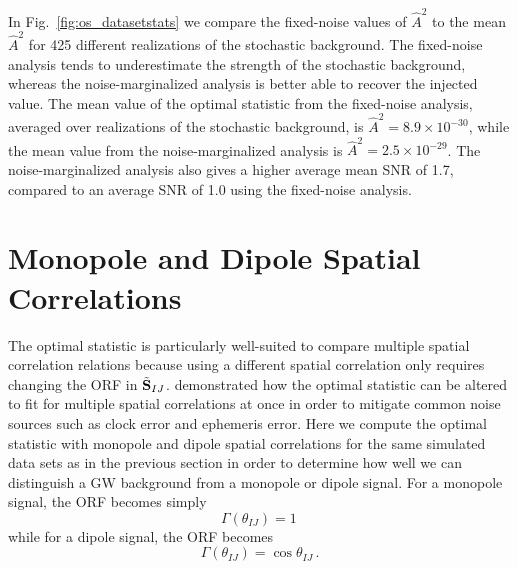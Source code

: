 \documentclass[twocolumn,aps,prd,superscriptaddress]{revtex4-1}
\newcommand{\Agw}{\ensuremath{A_\mathrm{gw}}}
\begin{document}
In Fig.~\ref{fig:os_datasetstats} we compare the fixed-noise values of $\hat{A}^2$ 
to the mean $\hat{A}^2$ for 425 different realizations of the stochastic background. 
The fixed-noise analysis tends to underestimate the strength of the stochastic background, 
whereas the noise-marginalized analysis is better able to recover the injected value. 
The mean value of the optimal statistic from the fixed-noise analysis, 
averaged over realizations of the stochastic background, is $\hat{A}^2 = 8.9 \times 10^{-30}$, 
while the mean value from the noise-marginalized analysis is $\hat{A}^2 = 2.5 \times 10^{-29}$. 
The noise-marginalized analysis also gives a higher average mean SNR of 1.7, 
compared to an average SNR of 1.0 using the fixed-noise analysis.


\section{Monopole and Dipole Spatial Correlations}
\label{sec:spatial}

The optimal statistic is particularly well-suited to compare multiple spatial correlation relations 
because using a different spatial correlation only requires changing the ORF 
in $\tilde{{\bf{S}}}_{IJ}$. 
\citet{thk+2016} demonstrated how the optimal statistic can be altered to fit for 
multiple spatial correlations at once in order to mitigate common noise sources such as 
clock error and ephemeris error. 
Here we compute the optimal statistic with monopole and dipole spatial correlations 
for the same simulated data sets as in the previous section in order to determine 
how well we can distinguish a GW background from a monopole or dipole signal. 
For a monopole signal, the ORF becomes simply
\[ \Gamma(\theta_{IJ}) = 1 \,\]
while for a dipole signal, the ORF becomes
\[ \Gamma(\theta_{IJ}) = \cos\theta_{IJ} \,. \]
\end{document}

